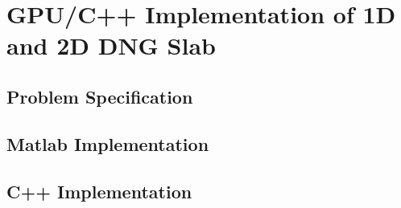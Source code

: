 \chapter{GPU/C++ Implementation of 1D and 2D DNG Slab}
\section{Problem Specification}
\section{Matlab Implementation}
\section{C++ Implementation}
